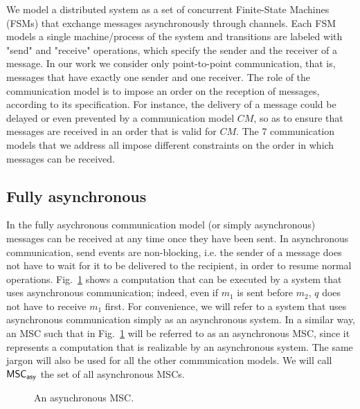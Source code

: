 We model a distributed system as a set of concurrent Finite-State Machines (FSMs) that exchange messages asynchronously through channels. Each FSM models a single machine/process of the system and transitions are labeled with "send" and "receive" operations, which specify the sender and the receiver of a message. In our work we consider only point-to-point communication, that is, messages that have exactly one sender and one receiver. The role of the communication model is to impose an order on the reception of messages, according to its specification. For instance, the delivery of a message could be delayed or even prevented by a communication model $CM$, so as to ensure that messages are received in an order that is valid for $CM$. The 7 communication models that we address all impose different constraints on the order in which messages can be received.

\subsection{Fully asynchronous}
In the fully asychronous communication model (or simply asynchronous) messages can be received at any time once they have been sent. In asynchronous communication, send events are non-blocking, i.e. the sender of a message does not have to wait for it to be delivered to the recipient, in order to resume normal operations. Fig.~\ref{fig:fully_asy_ex} shows a computation that can be executed by a system that uses asynchronous communication; indeed, even if $m_1$ is sent before $m_2$, $q$ does not have to receive $m_1$ first. For convenience, we will refer to a system that uses asynchronous communication simply as an asynchronous system. In a similar way, an MSC such that in Fig.~\ref{fig:fully_asy_ex} will be referred to as an asynchronous MSC, since it represents a computation that is realizable by an asynchronous system. The same jargon will also be used for all the other communication models. We will call $\mathsf{MSC}_{\mathsf{asy}}$ the set of all asynchronous MSCs.

\begin{figure}[h]
	\begin{center}
		\caption{An asynchronous MSC.}
		\label{fig:fully_asy_ex}
	\end{center}
\end{figure}

